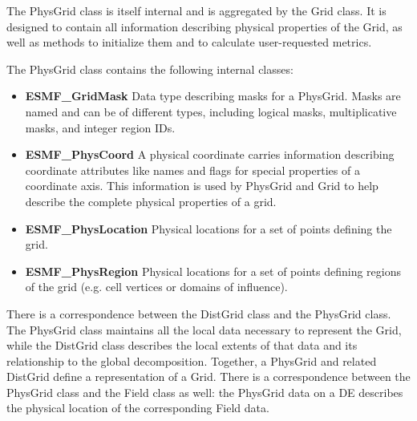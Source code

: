 %



The PhysGrid class is itself internal and is aggregated by the Grid
class.  It is designed to contain all information describing physical
properties of the Grid, as well as methods to initialize them and to
calculate user-requested metrics.

The PhysGrid class contains the following internal classes:
\begin{itemize}

\item {\bf ESMF\_GridMask} Data type describing masks for a PhysGrid.  Masks
are named and can be of different types, including logical masks,
multiplicative masks, and integer region IDs.

\item {\bf ESMF\_PhysCoord} A physical coordinate carries information describing
coordinate attributes like names and flags for special properties of a
coordinate axis.  This information is used by PhysGrid and Grid to help
describe the complete physical properties of a grid.

\item {\bf ESMF\_PhysLocation} Physical locations for a set of points defining the grid.

\item {\bf ESMF\_PhysRegion} Physical locations for a set of points defining regions of
the grid (e.g. cell vertices or domains of influence).
\end{itemize}






There is a correspondence between the DistGrid class and the PhysGrid
class.  The PhysGrid class maintains all the local data necessary to
represent the Grid, while the DistGrid class describes the local extents
of that data and its relationship to the global decomposition.
Together, a PhysGrid and related DistGrid define a representation of
a Grid.  There is a correspondence between the PhysGrid class and the Field
class as well:  the PhysGrid data on a DE describes the physical location
of the corresponding Field data.

